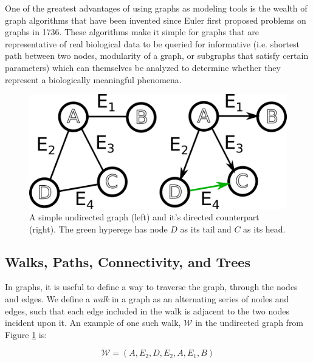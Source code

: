 \documentclass[12pt,twoside]{reedthesis}
\theoremstyle{definition}
\begin{document}
{  One of the greatest advantages of using graphs as modeling tools is the wealth of graph algorithms that have been invented since Euler first proposed problems on graphs in 1736. These algorithms make it simple for graphs that are representative of real biological data to be queried for informative (i.e. shortest path between two nodes, modularity of a graph, or subgraphs that satisfy certain parameters) which can themselves be analyzed to determine whether they represent a biologically meaningful phenomena.\par

  \begin{figure}[!h]
    \begin{center}
      \includegraphics[width=\textwidth/2]{simple_graph_du}
    \caption[Undirected \& Directed Graphs]{A simple undirected graph (left) and it's directed counterpart (right). The green hyperege has node $D$ as its tail and $C$ as its head.}
    \label{fig:simple_graph_du}
    \end{center}
  \end{figure}

   \subsection{Walks, Paths, Connectivity, and Trees}

   In graphs, it is useful to define a way to traverse the graph, through the nodes and edges. We define a \textit{walk} in a graph as an alternating series of nodes and edges, such that each edge included in the walk is adjacent to the two nodes incident upon it. An example of one such walk, $\mathcal{W}$ in the undirected graph from Figure \ref{fig:simple_graph_du} is:

   \begin{equation*}
     \mathcal{W} = (A,E_2,D,E_2,A,E_1,B)
   \end{equation*}

}
\end{document}
